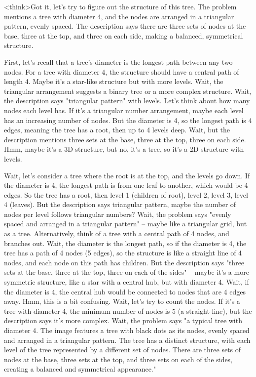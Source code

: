 <think>Got it, let's try to figure out the structure of this tree. The problem mentions a tree with diameter 4, and the nodes are arranged in a triangular pattern, evenly spaced. The description says there are three sets of nodes at the base, three at the top, and three on each side, making a balanced, symmetrical structure. 

First, let's recall that a tree's diameter is the longest path between any two nodes. For a tree with diameter 4, the structure should have a central path of length 4. Maybe it's a star-like structure but with more levels. Wait, the triangular arrangement suggests a binary tree or a more complex structure. Wait, the description says "triangular pattern" with levels. Let's think about how many nodes each level has. If it's a triangular number arrangement, maybe each level has an increasing number of nodes. But the diameter is 4, so the longest path is 4 edges, meaning the tree has a root, then up to 4 levels deep. Wait, but the description mentions three sets at the base, three at the top, three on each side. Hmm, maybe it's a 3D structure, but no, it's a tree, so it's a 2D structure with levels. 

Wait, let's consider a tree where the root is at the top, and the levels go down. If the diameter is 4, the longest path is from one leaf to another, which would be 4 edges. So the tree has a root, then level 1 (children of root), level 2, level 3, level 4 (leaves). But the description says triangular pattern, maybe the number of nodes per level follows triangular numbers? Wait, the problem says "evenly spaced and arranged in a triangular pattern" – maybe like a triangular grid, but as a tree. Alternatively, think of a tree with a central path of 4 nodes, and branches out. Wait, the diameter is the longest path, so if the diameter is 4, the tree has a path of 4 nodes (5 edges), so the structure is like a straight line of 4 nodes, and each node on this path has children. But the description says "three sets at the base, three at the top, three on each of the sides" – maybe it's a more symmetric structure, like a star with a central hub, but with diameter 4. Wait, if the diameter is 4, the central hub would be connected to nodes that are 4 edges away. Hmm, this is a bit confusing. Wait, let's try to count the nodes. If it's a tree with diameter 4, the minimum number of nodes is 5 (a straight line), but the description says it's more complex. Wait, the problem says "a typical tree with diameter 4. The image features a tree with black dots as its nodes, evenly spaced and arranged in a triangular pattern. The tree has a distinct structure, with each level of the tree represented by a different set of nodes. There are three sets of nodes at the base, three sets at the top, and three sets on each of the sides, creating a balanced and symmetrical appearance." 

